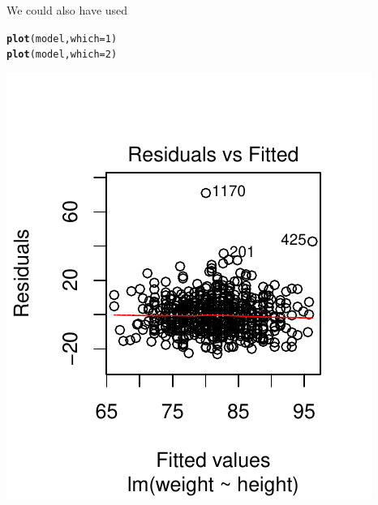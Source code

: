 \documentclass[twoside]{book}\usepackage[]{graphicx}\usepackage[]{xcolor}
\makeatletter
\def\maxwidth{ %
  \ifdim\Gin@nat@width>\linewidth
    \linewidth
  \else
    \Gin@nat@width
  \fi
}
\newcommand{\hlnum}[1]{\textcolor[rgb]{0.686,0.059,0.569}{#1}}%
\newcommand{\hlstd}[1]{\textcolor[rgb]{0.345,0.345,0.345}{#1}}%
\newcommand{\hlkwc}[1]{\textcolor[rgb]{0.333,0.667,0.333}{#1}}%
\newcommand{\hlkwd}[1]{\textcolor[rgb]{0.737,0.353,0.396}{\textbf{#1}}}%
\newenvironment{kframe}{%
 \def\at@end@of@kframe{}%
 \ifinner\ifhmode%
  \def\at@end@of@kframe{\end{minipage}}%
  \begin{minipage}{\columnwidth}%
 \fi\fi%
 \def\FrameCommand##1{\hskip\@totalleftmargin \hskip-\fboxsep
 \colorbox{shadecolor}{##1}\hskip-\fboxsep
     \hskip-\linewidth \hskip-\@totalleftmargin \hskip\columnwidth}%
 \MakeFramed {\advance\hsize-\width
   \@totalleftmargin\z@ \linewidth\hsize
   \@setminipage}}%
 {\par\unskip\endMakeFramed%
 \at@end@of@kframe}
\newenvironment{knitrout}{}{} %
\makeatother
\begin{document}
\begin{solution}
\begin{enumerate}
\begin{knitrout}
{}



\end{knitrout}
We could also have used
\begin{knitrout}
\color{fgcolor}\begin{kframe}
\begin{alltt}
\hlkwd{plot}\hlstd{(model,} \hlkwc{which} \hlstd{=} \hlnum{1}\hlstd{)}
\hlkwd{plot}\hlstd{(model,} \hlkwc{which} \hlstd{=} \hlnum{2}\hlstd{)}
\end{alltt}
\end{kframe}

{\centering \includegraphics[width=\maxwidth]{figures/fig-unnamed-chunk-195-1} 
}
\end{knitrout}
\end{enumerate}
\end{solution}
\end{document}

